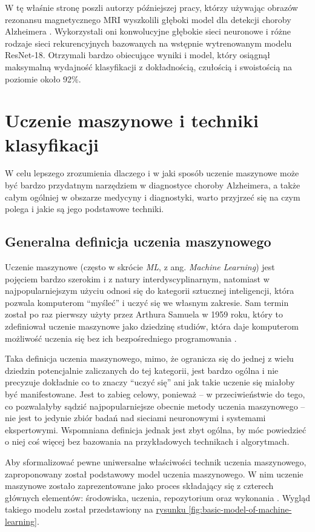 W tę właśnie stronę poszli autorzy późniejszej pracy, którzy używając obrazów rezonansu magnetycznego MRI wyszkolili głęboki model dla detekcji choroby Alzheimera \cite{ebrahimi2021deep}.
Wykorzystali oni konwolucyjne głębokie sieci neuronowe i różne rodzaje sieci rekurencyjnych bazowanych na wstępnie wytrenowanym modelu ResNet-18.
Otrzymali bardzo obiecujące wyniki i model, który osiągnął maksymalną wydajność klasyfikacji z dokładnością, czułością i swoistością na poziomie około 92\%.

\section{Uczenie maszynowe i techniki klasyfikacji}

W celu lepszego zrozumienia dlaczego i w jaki sposób uczenie maszynowe może być bardzo przydatnym narzędziem w diagnostyce choroby Alzheimera, a także całym ogólniej w obszarze medycyny i diagnostyki, warto przyjrzeć się na czym polega i jakie są jego podstawowe techniki.

\subsection{Generalna definicja uczenia maszynowego}

Uczenie maszynowe (często w skrócie \emph{ML}, z ang. \emph{Machine Learning}) jest pojęciem bardzo szerokim i z natury interdyscyplinarnym, natomiast w najpopularniejszym użyciu odnosi się do kategorii sztucznej inteligencji, która pozwala komputerom ``myśleć'' i uczyć się we własnym zakresie.
Sam termin został po raz pierwszy użyty przez Arthura Samuela w 1959 roku, który to zdefiniował uczenie maszynowe jako dziedzinę studiów, która daje komputerom możliwość uczenia się bez ich bezpośredniego programowania \cite{samuel1959some}.

Taka definicja uczenia maszynowego, mimo, że ogranicza się do jednej z wielu dziedzin potencjalnie zaliczanych do tej kategorii, jest bardzo ogólna i nie precyzuje dokładnie co to znaczy ``uczyć się'' ani jak takie uczenie się miałoby być manifestowane.
Jest to zabieg celowy, ponieważ -- w przeciwieństwie do tego, co pozwalałyby sądzić najpopularniejsze obecnie metody uczenia maszynowego -- nie jest to jedynie zbiór badań nad sieciami neuronowymi i systemami ekspertowymi.
Wspomniana definicja jednak jest zbyt ogólna, by móc powiedzieć o niej coś więcej bez bazowania na przykładowych technikach i algorytmach.

Aby sformalizować pewne uniwersalne właściwości technik uczenia maszynowego, zaproponowany został podstawowy model uczenia maszynowego.
W nim uczenie maszynowe zostało zaprezentowane jako proces składający się z czterech głównych elementów: środowiska, uczenia, repozytorium oraz wykonania \cite{wang2009brief}.
Wygląd takiego modelu został przedstawiony na \hyperref[fig:basic-model-of-machine-learning]{rysunku \ref*{fig:basic-model-of-machine-learning}}.

